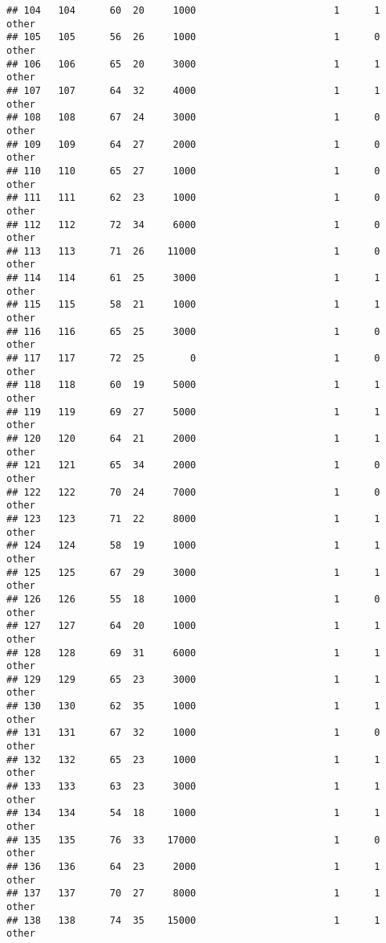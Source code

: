 \documentclass[
]{article}
\begin{document}
\begin{verbatim}
## 104   104      60  20     1000                        1      1    other
## 105   105      56  26     1000                        1      0    other
## 106   106      65  20     3000                        1      1    other
## 107   107      64  32     4000                        1      1    other
## 108   108      67  24     3000                        1      0    other
## 109   109      64  27     2000                        1      0    other
## 110   110      65  27     1000                        1      0    other
## 111   111      62  23     1000                        1      0    other
## 112   112      72  34     6000                        1      0    other
## 113   113      71  26    11000                        1      0    other
## 114   114      61  25     3000                        1      1    other
## 115   115      58  21     1000                        1      1    other
## 116   116      65  25     3000                        1      0    other
## 117   117      72  25        0                        1      0    other
## 118   118      60  19     5000                        1      1    other
## 119   119      69  27     5000                        1      1    other
## 120   120      64  21     2000                        1      1    other
## 121   121      65  34     2000                        1      0    other
## 122   122      70  24     7000                        1      0    other
## 123   123      71  22     8000                        1      1    other
## 124   124      58  19     1000                        1      1    other
## 125   125      67  29     3000                        1      1    other
## 126   126      55  18     1000                        1      0    other
## 127   127      64  20     1000                        1      1    other
## 128   128      69  31     6000                        1      1    other
## 129   129      65  23     3000                        1      1    other
## 130   130      62  35     1000                        1      1    other
## 131   131      67  32     1000                        1      0    other
## 132   132      65  23     1000                        1      1    other
## 133   133      63  23     3000                        1      1    other
## 134   134      54  18     1000                        1      1    other
## 135   135      76  33    17000                        1      0    other
## 136   136      64  23     2000                        1      1    other
## 137   137      70  27     8000                        1      1    other
## 138   138      74  35    15000                        1      1    other

\end{verbatim}
\end{document}
